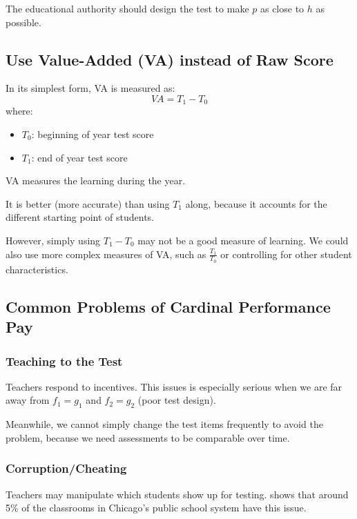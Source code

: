             The educational authority should design the test to make $p$ as close to $h$ as possible.

    \subsection{Use Value-Added (VA) instead of Raw Score}

        In its simplest form, VA is measured as:
        \begin{equation*}
            VA = T_1 - T_0
        \end{equation*}
        where:
        \begin{itemize}
            \item $T_0$: beginning of year test score
            \item $T_1$: end of year test score
        \end{itemize}
        VA measures the learning during the year.

        It is better (more accurate) than using $T_1$ along, because it accounts for the different starting point of students. 

        However, simply using $T_1-T_0$ may not be a good measure of learning. We could also use more complex measures of VA, such as $\frac{T_1}{T_0}$ or controlling for other student characteristics.
        
    \subsection{Common Problems of Cardinal Performance Pay}

        \subsubsection{Teaching to the Test}

            Teachers respond to incentives. This issues is especially serious when we are far away from $f_1=g_1$ and $f_2=g_2$ (poor test design).

            Meanwhile, we cannot simply change the test items frequently to avoid the problem, because we need assessments to be comparable over time.

        \subsubsection{Corruption/Cheating}

            Teachers may manipulate which students show up for testing. \cite{jacob_rotten_2003} shows that around 5\% of the classrooms in Chicago's public school system have this issue.
        

